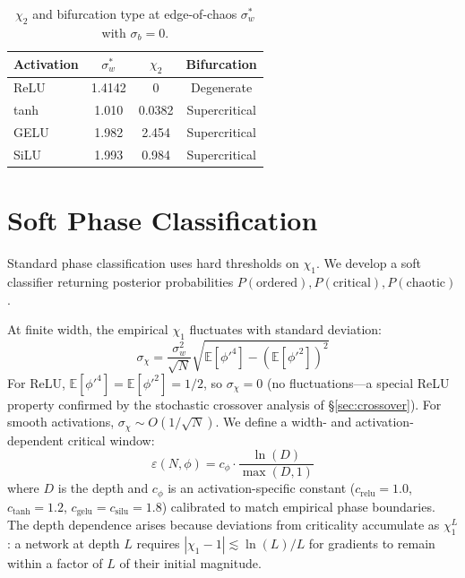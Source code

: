 \documentclass[10pt]{article}
\newcommand{\EE}{\mathbb{E}}
\begin{document}
\begin{table}[t]
\centering
\caption{$\chi_2$ and bifurcation type at edge-of-chaos $\sigma_w^*$ with $\sigma_b = 0$.}
\label{tab:chi2}
\small
\begin{tabular}{@{}lccc@{}}
\toprule
\textbf{Activation} & $\sigma_w^*$ & $\chi_2$ & \textbf{Bifurcation} \\
\midrule
ReLU  & 1.4142 & 0        & Degenerate \\
tanh  & 1.010  & 0.0382   & Supercritical \\
GELU  & 1.982  & 2.454    & Supercritical \\
SiLU  & 1.993  & 0.984    & Supercritical \\
\bottomrule
\end{tabular}
\end{table}

\section{Soft Phase Classification}
\label{sec:calibrated}

Standard phase classification uses hard thresholds on $\chi_1$.
We develop a soft classifier returning posterior probabilities $P(\text{ordered}), P(\text{critical}), P(\text{chaotic})$.

At finite width, the empirical $\chi_1$ fluctuates with standard deviation:
\begin{equation}
    \sigma_\chi = \frac{\sigma_w^2}{\sqrt{N}}\sqrt{\EE[\phi'^4] - (\EE[\phi'^2])^2}
    \label{eq:chi1-fluctuation}
\end{equation}
For ReLU, $\EE[\phi'^4] = \EE[\phi'^2] = 1/2$, so $\sigma_\chi = 0$ (no fluctuations---a special ReLU property confirmed by the stochastic crossover analysis of \S\ref{sec:crossover}).
For smooth activations, $\sigma_\chi \sim O(1/\sqrt{N})$.
We define a width- and activation-dependent critical window:
\begin{equation}
    \varepsilon(N, \phi) = c_\phi \cdot \frac{\ln(D)}{\max(D,1)}
    \label{eq:critical-window}
\end{equation}
where $D$ is the depth and $c_\phi$ is an activation-specific constant ($c_{\text{relu}} = 1.0$, $c_{\text{tanh}} = 1.2$, $c_{\text{gelu}} = c_{\text{silu}} = 1.8$) calibrated to match empirical phase boundaries.
The depth dependence arises because deviations from criticality accumulate as $\chi_1^L$: a network at depth $L$ requires $|\chi_1 - 1| \lesssim \ln(L)/L$ for gradients to remain within a factor of $L$ of their initial magnitude.
\end{document}
